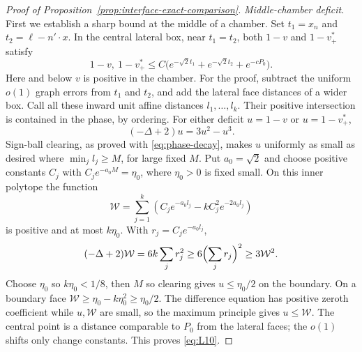 \begin{proof}[Proof of Proposition~\ref{prop:interface-exact-comparison}]
\emph{Middle-chamber deficit.}
First we establish a sharp bound at the middle of a chamber.  Set
$t_1=x_n$ and $t_2=\ell-n'\cdot x$.  In the central lateral box,
near $t_1=t_2$, both $1-v$ and $1-v^*_+$ satisfy
\begin{equation}\label{eq:L10}
 1-v,\ 1-v^*_+
       \le C\bigl(e^{-\sqrt2 t_1}+e^{-\sqrt2 t_2}+e^{-cP_0}\bigr).
\end{equation}
Here and below $v$ is positive in the chamber.
For the proof, subtract the uniform $o(1)$ graph errors from $t_1$
and $t_2$, and add the lateral face distances of a wider box.
Call all these inward unit affine distances $l_1,\ldots,l_k$.
Their positive intersection is contained in the phase, by ordering.
For either deficit $u=1-v$ or $u=1-v^*_+$,
\[
 (-\Delta+2)u=3u^2-u^3.
\]
Sign-ball clearing, as proved with \eqref{eq:phase-decay}, makes
$u$ uniformly as small as desired where $\min_jl_j\ge M$, for
large fixed $M$.  Put $a_0=\sqrt2$ and choose positive constants
$C_j$ with $C_je^{-a_0M}=\eta_0$, where $\eta_0>0$ is fixed small.
On this inner polytope the function
\[
 \mathcal W=\sum_{j=1}^k
           \left(C_je^{-a_0l_j}-kC_j^2e^{-2a_0l_j}\right)
\]
is positive and at most $k\eta_0$.  With $r_j=C_je^{-a_0l_j}$,
\[
 (-\Delta+2)\mathcal W=6k\sum_jr_j^2
       \ge6\Bigl(\sum_jr_j\Bigr)^2\ge3\mathcal W^2.
\]
Choose $\eta_0$ so $k\eta_0<1/8$, then $M$ so clearing gives
$u\le\eta_0/2$ on the boundary.  On a boundary face
$\mathcal W\ge\eta_0-k\eta_0^2\ge\eta_0/2$.
The difference equation has positive zeroth coefficient while
$u,\mathcal W$ are small, so the maximum principle gives
$u\le\mathcal W$.  The central point is a distance comparable to
$P_0$ from the lateral faces; the $o(1)$ shifts only change constants.
This proves \eqref{eq:L10}.


\end{proof}
